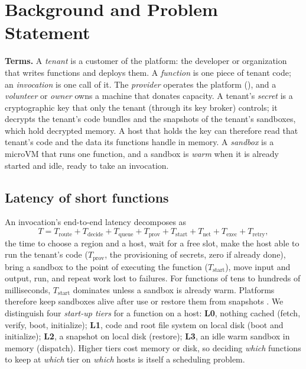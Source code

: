 \section{Background and Problem Statement}
\label{sec:background}

\textbf{Terms.} A \emph{tenant} is a customer of the platform: the developer or organization that writes functions and deploys them. A \emph{function} is one piece of tenant code; an \emph{invocation} is one call of it. The \emph{provider} operates the platform (\voss{}), and a \emph{volunteer} or \emph{owner} owns a machine that donates capacity. A tenant's \emph{secret} is a cryptographic key that only the tenant (through its key broker) controls; it decrypts the tenant's code bundles and the snapshots of the tenant's sandboxes, which hold decrypted memory. A host that holds the key can therefore read that tenant's code and the data its functions handle in memory. A \emph{sandbox} is a microVM that runs one function, and a sandbox is \emph{warm} when it is already started and idle, ready to take an invocation.

\subsection{Latency of short functions}
An invocation's end-to-end latency decomposes as
\begin{equation}
T = T_{\text{route}} + T_{\text{decide}} + T_{\text{queue}} + T_{\text{prov}} + T_{\text{start}} + T_{\text{net}} + T_{\text{exec}} + T_{\text{retry}},
\label{eq:latency}
\end{equation}
the time to choose a region and a host, wait for a free slot, make the host able to run the tenant's code
($T_{\text{prov}}$, the provisioning of secrets, zero if already done), bring a sandbox to the point of executing the function
($T_{\text{start}}$), move input and output, run, and repeat work lost to failures. For functions of tens to hundreds of
milliseconds, $T_{\text{start}}$ dominates unless a sandbox is already warm. Platforms therefore keep sandboxes alive after use or
restore them from snapshots \cite{shahrad2020wild,fuerst2021faascache,ao2022faasnap,cadden2020seuss}. We distinguish four
\emph{start-up tiers} for a function on a host: \textbf{L0}, nothing cached (fetch, verify, boot, initialize);
\textbf{L1}, code and root file system on local disk (boot and initialize); \textbf{L2}, a snapshot on local disk (restore);
\textbf{L3}, an idle warm sandbox in memory (dispatch). Higher tiers cost memory or disk, so deciding \emph{which} functions
to keep at \emph{which} tier on \emph{which} hosts is itself a scheduling problem.

